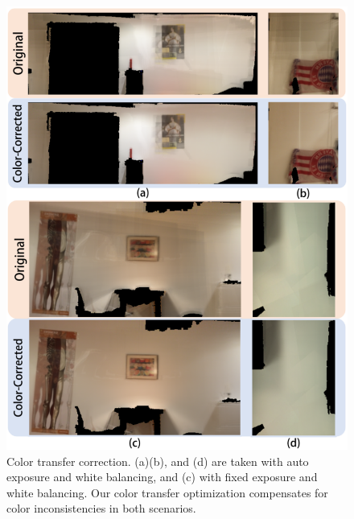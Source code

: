 \begin{figure}
\begin{minipage}{0.49\linewidth}
\centering
\includegraphics[width=0.8\linewidth]{3dlite/fig18.png}
\caption{Color transfer correction. (a)(b), and (d) are taken with auto exposure and white balancing, and (c) with fixed exposure and white balancing. Our color transfer optimization compensates for color inconsistencies in both scenarios. }
\label{fig:3dlite-eval-color-transfer}
\end{minipage}
\end{figure}

